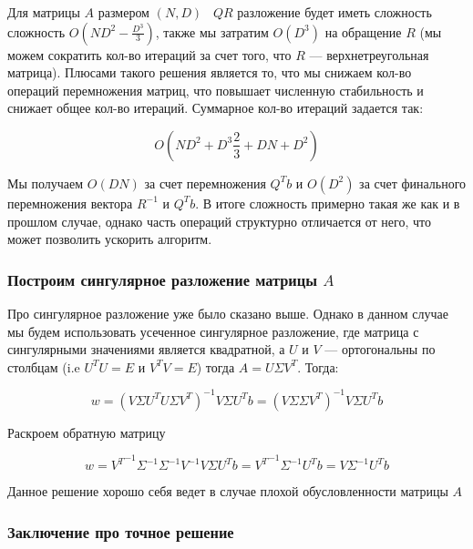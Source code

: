 \documentclass{article}
\begin{document}
    Для матрицы $A$ размером $(N, D)$ \ $QR$ разложение будет иметь сложность сложность $O(ND^{2} - \frac{D^{3}}{3})$,
    также мы затратим $O(D^{3})$ на обращение $R$ (мы можем сократить кол-во итераций за счет того, что $R$ --- верхнетреугольная матрица).
    Плюсами такого решения является то, что мы снижаем кол-во операций перемножения матриц, что повышает численную стабильность
    и снижает общее кол-во итераций.
    Суммарное кол-во итераций задается так:

    \begin{equation}
        O(ND^{2} + D^{3}  \frac{2}{3} + DN + D^{2})
    \end{equation}

    Мы получаем $O(DN)$ за счет перемножения $Q^{T} b$ и $O(D^{2})$ за счет финального перемножения вектора $R^{-1}$ и $Q^{T} b$.
    В итоге сложность примерно такая же как и в прошлом случае, однако часть операций структурно отличается от него, что может позволить ускорить
    алгоритм.


    \subsubsection{Построим сингулярное разложение матрицы $A$}


    Про сингулярное разложение уже было сказано выше.
    Однако в данном случае мы будем использовать усеченное сингулярное разложение, где матрица с сингулярными значениями
    является квадратной, а $U$ и $V$ --- ортогональны по столбцам (i.e $U^{T}U = E$ и $V^{T}V = E$) тогда $A = U \Sigma V^{T} $.
    Тогда:

    \begin{equation}
        w = (V \Sigma U^{T} U \Sigma V^{T})^{-1} V \Sigma U^{T} b = (V \Sigma \Sigma V^{T})^{-1} V \Sigma U^{T} b
    \end{equation}

    Раскроем обратную матрицу

    \begin{equation}
        w = {V^{T}}^{-1} \Sigma^{-1} \Sigma^{-1} V^{-1} V \Sigma U^{T} b = {V^{T}}^{-1} \Sigma^{-1}  U^{T} b = V \Sigma^{-1}  U^{T} b
    \end{equation}

    Данное решение хорошо себя ведет в случае плохой обусловленности матрицы $A$

    \subsubsection{Заключение про точное решение}
\end{document}
